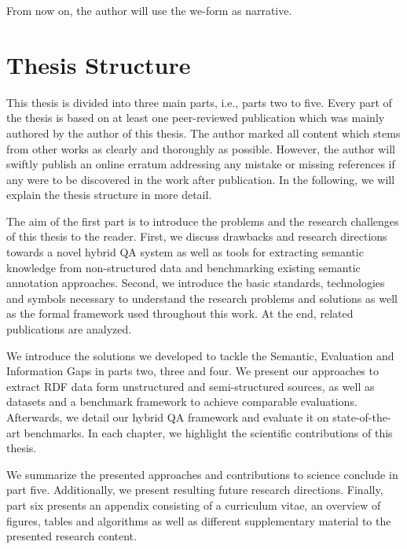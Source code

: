 From now on, the author will use the we-form as narrative.


\section*{Thesis Structure}

This thesis is divided into three main parts, i.e., parts two to five.
Every part of the thesis is based on at least one peer-reviewed publication which was mainly authored by the author of this thesis.
The author marked all content which stems from other works as clearly and thoroughly as possible. 
However, the author will swiftly publish an online erratum addressing any mistake or missing references if any were to be discovered in the work after publication.
In the following, we will explain the thesis structure in more detail.

The aim of the first part is to introduce the problems and the research challenges of this thesis to the reader. 
First, we discuss drawbacks and research directions towards a novel hybrid \ac{QA} system as well as tools for extracting semantic knowledge from non-structured data and benchmarking existing semantic annotation approaches.
Second, we introduce the basic standards, technologies and symbols necessary to understand the research problems and solutions as well as the formal framework used throughout this work.
At the end, related publications are analyzed.

We introduce the solutions we developed to tackle the Semantic, Evaluation and Information Gaps in parts two, three and four.  
We  present our approaches to extract \ac{RDF} data form unstructured and semi-structured sources, as well as datasets and a benchmark framework to achieve comparable evaluations. 
Afterwards, we detail our hybrid \ac{QA} framework and evaluate it on state-of-the-art benchmarks.
In each chapter, we highlight the scientific contributions of this thesis.

We  summarize the presented approaches and contributions to science conclude in part five. 
Additionally, we present resulting future research directions.
Finally, part six presents an appendix consisting of a curriculum vitae, an overview of figures, tables and algorithms as well as different supplementary material to the presented research content.